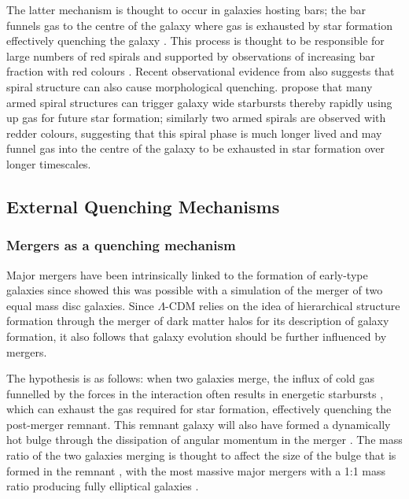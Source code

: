 The latter mechanism is {\minor thought} to occur in galaxies hosting bars; the bar funnels gas to the centre of the galaxy \citep{athanassoula92a} where gas is exhausted by star formation effectively quenching the galaxy \citep{zurita04, sheth05}. This process is thought to be responsible for large numbers of red spirals and supported by observations of increasing bar fraction with red colours \citep{masters11a}. Recent observational evidence from \cite{hart16} also suggests that spiral structure can also cause morphological quenching. \citeauthor{hart16} propose that many armed spiral structures can trigger galaxy wide starbursts thereby rapidly using up gas for future star formation; similarly two armed spirals are observed with redder colours, suggesting that this spiral phase is much longer lived and may funnel gas into the centre of the galaxy to be exhausted in star formation over longer timescales.  
  
\subsection{External Quenching Mechanisms}\label{sec:extquench}
  
\subsubsection{Mergers as a quenching mechanism}\label{sec:mergersquench}

Major mergers have been intrinsically linked to the formation of {\minor early-type} galaxies since \citet{toomre72} showed this was possible with a simulation of the merger of two equal mass disc galaxies. Since $\Lambda$-CDM relies on the idea of hierarchical structure formation through the merger of dark matter halos for its description of galaxy formation, it also follows that galaxy evolution should be further influenced by mergers. 

The hypothesis is as follows: when two galaxies merge, the influx of cold gas funnelled by the forces in the interaction often results in energetic starbursts \citep{mihos94, mihos96, hopkins06d, hopkins08a, hopkins08b, snyder11, hayward14, sparre16}, which can exhaust the gas required for star formation, effectively quenching the post-merger remnant. This remnant galaxy will also have formed a dynamically hot bulge through the dissipation of angular momentum in the merger \citep{toomre77, walker96, kormendy04, hopkins11c, martig12}. The mass ratio of the two galaxies merging is thought to affect the size of the bulge that is formed in the remnant \citep{cox08, hopkins09c, tonini16}, with the most massive major mergers with a 1:1 mass ratio producing fully elliptical galaxies \citep{toomre72, barnes96, mihos96, kauffmann96, pontzen16}.

